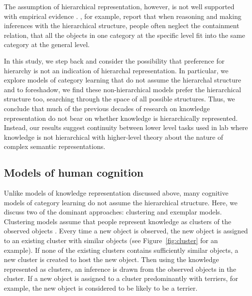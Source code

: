 \documentclass[doc]{apa6}
\begin{document}
The assumption of hierarchical representation, however, is not well supported with empirical
evidence \parencite[see][for review]{Murphy1997a}. \textcite{Sloman1998a}, for example, report that
when reasoning and making inferences with the hierarchical structure, people often neglect the
containment relation, that all the objects in one category at the specific level fit into the same
category at the general level.

In this study, we step back and consider the possibility that preference for hierarchy is not an
indication of hierarchal representation.  In particular, we explore models of category learning that
do not assume the hierarchal structure and to foreshadow, we find these non-hierarchical models
prefer the hierarchical structure too, searching through the space of all possible structures.
Thus, we conclude that much of the previous decades of research on knowledge representation do not
bear on whether knowledge is hierarchically represented.  Instead, our results suggest continuity
between lower level tasks used in lab where knowledge is not hierarchical with higher-level theory
about the nature of complex semantic representations.



\subsection*{Models of human cognition}

Unlike models of knowledge representation discussed above, many cognitive models of category
learning do not assume the hierarchical structure. Here, we discuss two of the dominant approaches:
clustering and exemplar models. Clustering models assume that people represent knowledge as clusters
of the observed objects \parencite[e.g.,][]{Anderson1991a, Love2004a, Sanborn2010a}. Every time a
new object is observed, the new object is assigned to an existing cluster with similar objects (see
Figure~\ref{fig:cluster} for an example). If none of the existing clusters contains sufficiently
similar objects, a new cluster is created to host the new object.  Then using the knowledge
represented as clusters, an inference is drawn from the observed objects in the cluster.  If a new
object is assigned to a cluster predominantly with terriers, for example, the new object is
considered to be likely to be a terrier.
\end{document}
